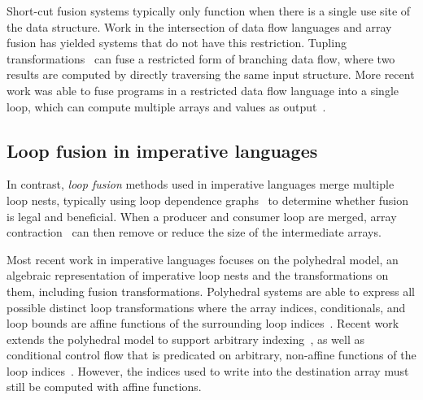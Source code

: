 Short-cut fusion systems typically only function when there is a single use site
of the data structure. Work in the intersection of data flow languages and array
fusion has yielded systems that do not have this restriction. Tupling
transformations~\cite{Hu:1997tk,Grelck:2006ci} can fuse a restricted form of
branching data flow, where two results are computed by directly traversing the
same input structure. More recent work was able to fuse programs in a restricted
data flow language into a single loop, which can compute multiple arrays and
values as output~\cite{Lippmeier:2013vz}.



\subsection{Loop fusion in imperative languages}

In contrast, \emph{loop fusion} methods used in imperative languages merge
multiple loop nests, typically using loop dependence graphs~\cite{Warren:1984ka}
to determine whether fusion is legal and beneficial. When a producer and
consumer loop are merged, array contraction~\cite{Sarkar:1991ff} can then remove
or reduce the size of the intermediate arrays.

Most recent work in imperative languages focuses on the polyhedral model, an
algebraic representation of imperative loop nests and the transformations on
them, including fusion transformations. Polyhedral systems are able to express
all possible distinct loop transformations where the array indices,
conditionals, and loop bounds are affine functions of the surrounding loop
indices~\cite{Pouchet:2011ig,Mehta:2014ir}. Recent work extends the polyhedral
model to support arbitrary indexing~\cite{Venkat:2014cg}, as well as conditional
control flow that is predicated on arbitrary, non-affine functions of the loop
indices~\cite{Benabderrahmane:2010vc}. However, the indices used to write into
the destination array must still be computed with affine functions.

